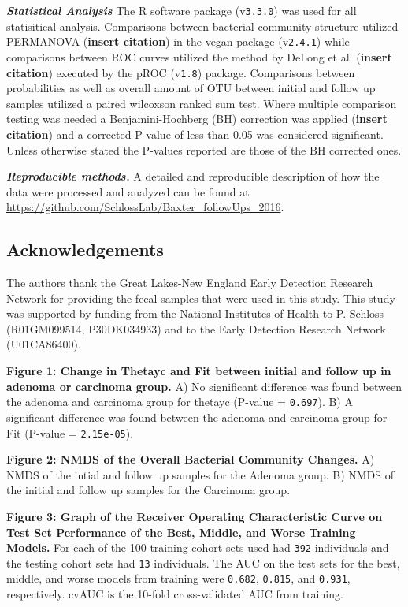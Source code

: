 \documentclass[12pt,]{article}
\begin{document}
\textbf{\emph{Statistical Analysis}} The R software package
(v\texttt{3.3.0}) was used for all statisitical analysis. Comparisons
between bacterial community structure utilized PERMANOVA (\textbf{insert
citation}) in the vegan package (v\texttt{2.4.1}) while comparisons
between ROC curves utilized the method by DeLong et al. (\textbf{insert
citation}) executed by the pROC (v\texttt{1.8}) package. Comparisons
between probabilities as well as overall amount of OTU between initial
and follow up samples utilized a paired wilcoxson ranked sum test. Where
multiple comparison testing was needed a Benjamini-Hochberg (BH)
correction was applied (\textbf{insert citation}) and a corrected
P-value of less than 0.05 was considered significant. Unless otherwise
stated the P-values reported are those of the BH corrected ones.

\textbf{\emph{Reproducible methods.}} A detailed and reproducible
description of how the data were processed and analyzed can be found at
\url{https://github.com/SchlossLab/Baxter_followUps_2016}.

\newpage

\subsection{Acknowledgements}\label{acknowledgements}

The authors thank the Great Lakes-New England Early Detection Research
Network for providing the fecal samples that were used in this study.
This study was supported by funding from the National Institutes of
Health to P. Schloss (R01GM099514, P30DK034933) and to the Early
Detection Research Network (U01CA86400).

\newpage

\textbf{Figure 1: Change in Thetayc and Fit between initial and follow
up in adenoma or carcinoma group.} A) No significant difference was
found between the adenoma and carcinoma group for thetayc (P-value =
\texttt{0.697}). B) A significant difference was found between the
adenoma and carcinoma group for Fit (P-value = \texttt{2.15e-05}).

\textbf{Figure 2: NMDS of the Overall Bacterial Community Changes.} A)
NMDS of the intial and follow up samples for the Adenoma group. B) NMDS
of the initial and follow up samples for the Carcinoma group.

\textbf{Figure 3: Graph of the Receiver Operating Characteristic Curve
on Test Set Performance of the Best, Middle, and Worse Training Models.}
For each of the 100 training cohort sets used had \texttt{392}
individuals and the testing cohort sets had \texttt{13} individuals. The
AUC on the test sets for the best, middle, and worse models from
training were \texttt{0.682}, \texttt{0.815}, and \texttt{0.931},
respectively. cvAUC is the 10-fold cross-validated AUC from training.
\end{document}
